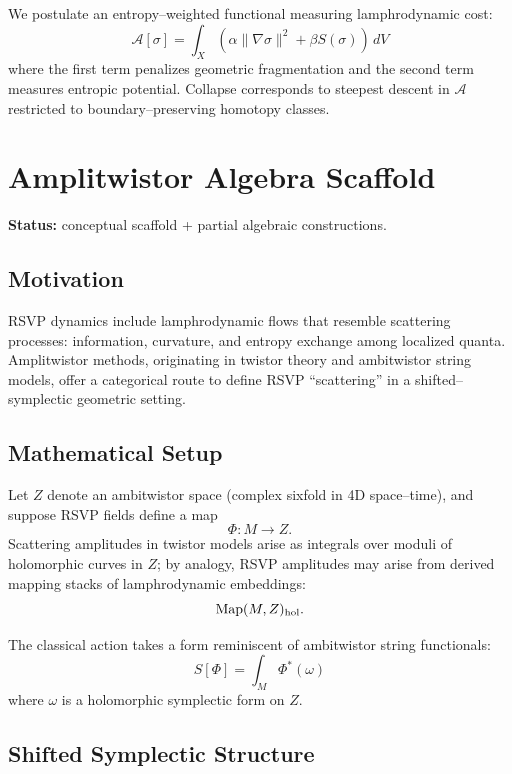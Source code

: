 \documentclass[12pt]{article}
\theoremstyle{plain}
\theoremstyle{definition}
\theoremstyle{remark}
\begin{document}
We postulate an entropy--weighted functional measuring lamphrodynamic cost:
\[
    \mathcal{A}[\sigma] 
    = \int_X \left( \alpha \|\nabla \sigma\|^2 + \beta S(\sigma)\right)\,dV
\]
where the first term penalizes geometric fragmentation and the second
term measures entropic potential. Collapse corresponds to steepest descent in
$\mathcal{A}$ restricted to boundary--preserving homotopy classes.


\section{Amplitwistor Algebra Scaffold}

\textbf{Status:} conceptual scaffold + partial algebraic constructions.

\subsection{Motivation}

RSVP dynamics include lamphrodynamic flows that resemble scattering processes:
information, curvature, and entropy exchange among localized quanta.
Amplitwistor methods, originating in twistor theory and ambitwistor string
models, offer a categorical route to define RSVP ``scattering'' in a
shifted--symplectic geometric setting.


\subsection{Mathematical Setup}

Let $Z$ denote an ambitwistor space (complex sixfold in 4D space--time), and
suppose RSVP fields define a map
\[
    \Phi : M \to Z.
\]
Scattering amplitudes in twistor models arise as integrals over moduli of
holomorphic curves in $Z$; by analogy, RSVP amplitudes may arise from derived
mapping stacks of lamphrodynamic embeddings:
\[
    {\rm Map}(M, Z)_{\mathrm{hol}}.
\]

The classical action takes a form reminiscent of ambitwistor string functionals:
\[
    S[\Phi] = \int_M \Phi^\ast(\omega)
\]
where $\omega$ is a holomorphic symplectic form on $Z$.


\subsection{Shifted Symplectic Structure}
\end{document}
